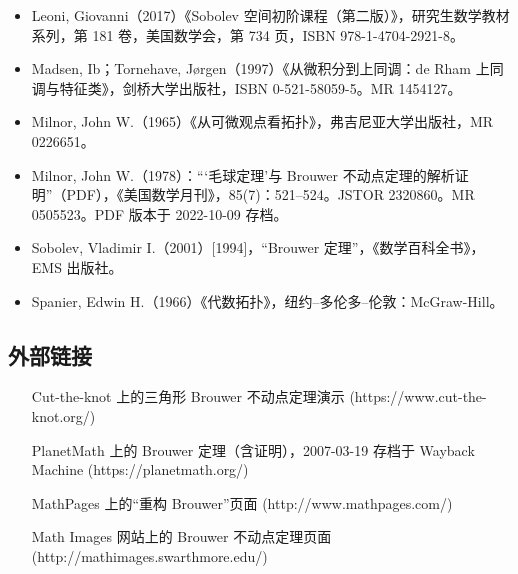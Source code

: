 \begin{itemize}
\item Leoni, Giovanni（2017）《Sobolev 空间初阶课程（第二版）》，研究生数学教材系列，第 181 卷，美国数学会，第 734 页，ISBN 978-1-4704-2921-8。
\item Madsen, Ib；Tornehave, Jørgen（1997）《从微积分到上同调：de Rham 上同调与特征类》，剑桥大学出版社，ISBN 0-521-58059-5。MR 1454127。
\item Milnor, John W.（1965）《从可微观点看拓扑》，弗吉尼亚大学出版社，MR 0226651。
\item Milnor, John W.（1978）：“‘毛球定理’与 Brouwer 不动点定理的解析证明”（PDF），《美国数学月刊》，85(7)：521–524。JSTOR 2320860。MR 0505523。PDF 版本于 2022-10-09 存档。
\item Sobolev, Vladimir I.（2001）[1994]，“Brouwer 定理”，《数学百科全书》，EMS 出版社。
\item Spanier, Edwin H.（1966）《代数拓扑》，纽约–多伦多–伦敦：McGraw-Hill。
\end{itemize}
\subsection{外部链接}
\begin{itemize}
\item [Cut-the-knot 上的三角形 Brouwer 不动点定理演示](https://www.cut-the-knot.org/)
\item [PlanetMath 上的 Brouwer 定理（含证明），2007-03-19 存档于 Wayback Machine](https://planetmath.org/)
\item [MathPages 上的“重构 Brouwer”页面](http://www.mathpages.com/)
\item [Math Images 网站上的 Brouwer 不动点定理页面](http://mathimages.swarthmore.edu/)
\end{itemize}
